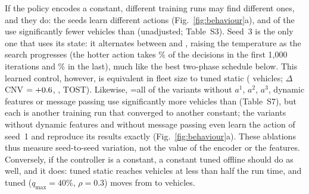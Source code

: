 If the policy encodes a constant, different training runs may find different ones, and
they do: the \rseedN{} seeds learn \rseedActN{} different actions
(Fig.~\ref{fig:behaviour}a), and \rseedSigN{} of the \rseedN{} use significantly fewer
vehicles than \Rw{} (unadjusted; Table~S3). Seed~3 is the only one that uses its state: it
alternates between \qSthreeActA{} and \qSthreeActB{}, raising the temperature as the
search progresses (the hotter action takes \qSthreeHotFirst{}\% of the decisions in the
first 1{,}000 iterations and \qSthreeHotLast{}\% in the last), much like the best
two-phase schedule below. This learned control, however, is equivalent in fleet size to
tuned static (\qSthreeCnv{} vehicles; $\Delta$CNV $=+0.6{}$, \qSthreepNVt{},
TOST). %
Likewise, \ifnum\rablWorse=\rablN\relax all \rablN{}\else \rablWorse{} of the \rablN{}\fi{} variants without $a^1$,
$a^2$, $a^3$, dynamic features or message passing use significantly more vehicles than
\sgalns{} (Table~S7), but each is another training run that converged to another
constant; the variants without dynamic features and without message passing even learn
the action of seed~1 and reproduce its results exactly (Fig.~\ref{fig:behaviour}a). %
These ablations thus measure seed-to-seed variation, not the value of the encoder or
the features. Conversely, if the controller is a constant, a constant tuned offline
should do as well, and it does: tuned static reaches \rcnvSt{} vehicles at less than
half the run time, and tuned \Rw{} ($q_{\max}=40\%$, $\rho=0.3$) moves \Rw{} from
\rcnvRw{} to \xcnvRwt{} vehicles.

